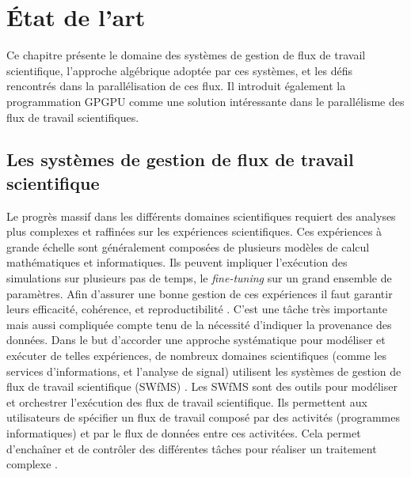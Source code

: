 \chapter{État de l'art}

Ce chapitre présente le domaine des systèmes de gestion de flux de travail scientifique, l'approche algébrique adoptée par ces systèmes, et les défis rencontrés dans la parallélisation de ces flux. Il introduit également  la programmation GPGPU comme une solution intéressante dans le parallélisme des flux de travail scientifiques. 

\section{Les systèmes de gestion de flux de travail scientifique}



Le progrès massif dans les différents domaines scientifiques requiert des analyses plus complexes et raffinées sur les expériences scientifiques. Ces expériences à grande échelle sont généralement composées de plusieurs modèles de calcul mathématiques et informatiques. Ils peuvent impliquer l'exécution des simulations sur plusieurs pas de temps, le \textit{fine-tuning} sur un grand ensemble de paramètres. Afin d’assurer une bonne gestion de ces expériences il faut garantir leurs efficacité, cohérence, et reproductibilité \cite{cal}. C’est une tâche très importante mais aussi compliquée compte tenu de la nécessité d'indiquer la provenance des données. Dans le but d'accorder une approche systématique pour modéliser et exécuter de telles expériences, de nombreux domaines scientifiques (comme les services d'informations, et l'analyse de signal) utilisent les systèmes de gestion de flux de travail scientifique (SWfMS) \cite{cal}. Les SWfMS sont des outils pour modéliser et orchestrer l'exécution des flux de travail scientifique. Ils permettent aux utilisateurs de spécifier un flux de travail composé par des activités (programmes informatiques) et par le flux de données entre ces activitées. Cela permet d'enchaîner et de contrôler des différentes tâches pour réaliser un traitement complexe \cite{oga11}. 

